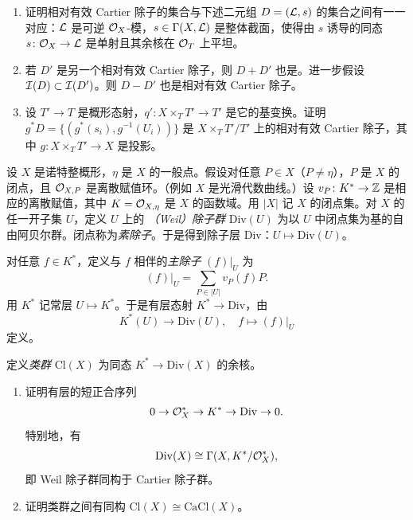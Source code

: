 \begin{exercises}
\begin{enumerate}[label=(\arabic*),leftmargin=2.4em,start=7]
  \item 证明相对有效 Cartier 除子的集合与下述二元组 $D=(\mathcal{L},s)$ 的集合之间有一一对应：$\mathcal{L}$ 是可逆 $\mathcal{O}_X$-模，$s\in\Gamma(X,\mathcal{L})$ 是整体截面，使得由 $s$ 诱导的同态 $s\colon\mathcal{O}_X\to\mathcal{L}$ 是单射且其余核在 $\mathcal{O}_T$ 上平坦。
  \item 若 $D'$ 是另一个相对有效 Cartier 除子，则 $D+D'$ 也是。进一步假设 $\mathcal{I}(D)\subset\mathcal{I}(D')$。则 $D-D'$ 也是相对有效 Cartier 除子。
  \item 设 $T'\to T$ 是概形态射，$q'\colon X\times_T T'\to T'$ 是它的基变换。证明 $g^{*}D=\{(g^{*}(s_i),g^{-1}(U_i))\}$ 是 $X\times_T T'/T'$ 上的相对有效 Cartier 除子，其中 $g\colon X\times_T T'\to X$ 是投影。
\end{enumerate}

\item \label{ex:2.3.3} 设 $X$ 是诺特整概形，$\eta$ 是 $X$ 的一般点。假设对任意 $P\in X$（$P\ne\eta$），$P$ 是 $X$ 的闭点，且 $\mathcal{O}_{X,P}$ 是离散赋值环。（例如 $X$ 是光滑代数曲线。）设 $v_P\colon K^{*}\to\mathbb{Z}$ 是相应的离散赋值，其中 $K=\mathcal{O}_{X,\eta}$ 是 $X$ 的函数域。用 $|X|$ 记 $X$ 的闭点集。对 $X$ 的任一开子集 $U$，定义 $U$ 上的 \emph{（Weil）除子群} $\mathrm{Div}(U)$ 为以 $U$ 中闭点集为基的自由阿贝尔群。闭点称为\emph{素除子}。于是得到除子层 $\mathrm{Div}$：$U\mapsto\mathrm{Div}(U)$。

对任意 $f\in K^{*}$，定义与 $f$ 相伴的\emph{主除子} $(f)|_U$ 为
\[
(f)|_U=\sum_{P\in|U|}v_P(f)P.
\]
用 $K^{*}$ 记常层 $U\mapsto K^{*}$。于是有层态射 $K^{*}\to\mathrm{Div}$，由
\[
K^{*}(U)\to\mathrm{Div}(U),\quad f\mapsto (f)|_U
\]
定义。

定义\emph{类群} $\mathrm{Cl}(X)$ 为同态 $K^{*}\to\mathrm{Div}(X)$ 的余核。
\begin{enumerate}[label=(\arabic*),leftmargin=2.4em]
  \item 证明有层的短正合序列
  \[
  0\to\mathcal{O}_X^{*}\to K^{*}\to\mathrm{Div}\to 0.
  \]
  特别地，有
  \[
  \mathrm{Div}(X)\cong\Gamma(X,K^{*}/\mathcal{O}_X^{*}),
  \]
  即 Weil 除子群同构于 Cartier 除子群。
  \item 证明类群之间有同构 $\mathrm{Cl}(X)\cong\mathrm{CaCl}(X)$。
\end{enumerate}
\end{exercises}


\endgroup
